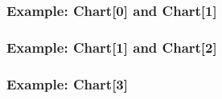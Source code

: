 \begin{frame}[fragile]
  \frametitle{Example: Chart[0] and Chart[1]}


{
}

\end{frame}


\begin{frame}[fragile]
  \frametitle{Example: Chart[1] and Chart[2]}





\end{frame}


\begin{frame}[fragile]
  \frametitle{Example: Chart[3]}





\end{frame}







  
  
  









